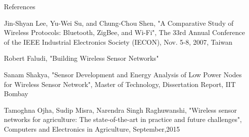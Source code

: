 \documentclass[t]{beamer} %
\begin{document}
\begin{frame}{References}
\begin{thebibliography}{9}
  Jin-Shyan Lee, Yu-Wei Su, and Chung-Chou Shen, "A Comparative Study of Wireless Protocols: Bluetooth, ZigBee, and Wi-Fi", The 33rd Annual Conference of the IEEE Industrial Electronics Society (IECON), Nov. 5-8, 2007, Taiwan

 Robert Faludi, "Building Wireless Sensor Networks"

 Sanam Shakya, "Sensor Development and Energy Analysis of Low Power Nodes for Wireless Sensor Network", Master of Technology, Dissertation Report, IIT Bombay

 Tamoghna Ojha, Sudip Misra, Narendra Singh Raghuwanshi, "Wireless sensor networks for agriculture: The state-of-the-art in practice and future challenges", Computers and Electronics in Agriculture, September,2015

\end{thebibliography}
\end{frame}
\end{document}
